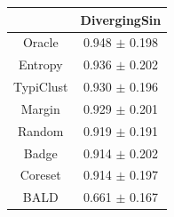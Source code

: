 \documentclass[]{article}
\begin{document}
\begin{minipage}{0.29\linewidth}
\begin{tabular}{c|c}
&DivergingSin\\
\hline
Oracle&0.948 $\pm$ 0.198\\
Entropy&0.936 $\pm$ 0.202\\
TypiClust&0.930 $\pm$ 0.196\\
Margin&0.929 $\pm$ 0.201\\
Random&0.919 $\pm$ 0.191\\
Badge&0.914 $\pm$ 0.202\\
Coreset&0.914 $\pm$ 0.197\\
BALD&0.661 $\pm$ 0.167\\
\end{tabular}
\end{minipage}
\end{document}
